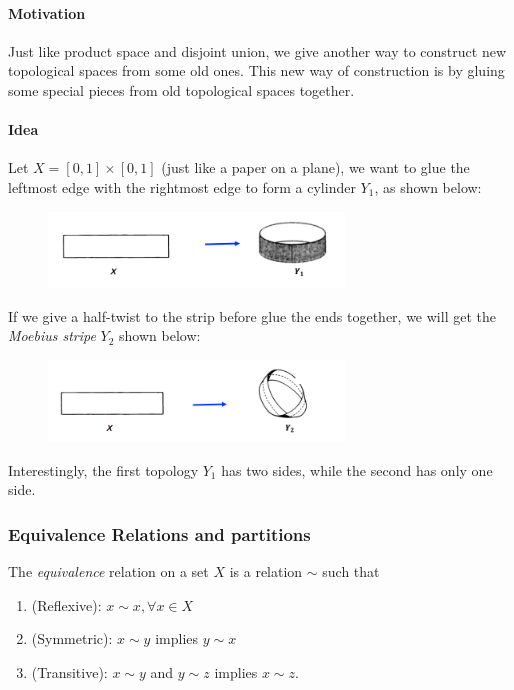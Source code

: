 \paragraph{Motivation}
Just like product space and disjoint union, we give another way to construct new topological spaces from some old ones. This new way of construction is by gluing some special pieces from old topological spaces together.
\paragraph{Idea}
Let $X=[0,1]\times[0,1]$ (just like a paper on a plane), we want to glue the leftmost edge with the rightmost edge to form a cylinder $Y_1$, as shown below:
\begin{figure}[H]
\centering
\includegraphics[width=0.7\textwidth]{week5/p_5}
\end{figure}
If we give a half-twist to the strip before glue the ends together, we will get the \emph{Moebius stripe} $Y_2$ shown below:
\begin{figure}[H]
\centering
\includegraphics[width=0.7\textwidth]{week5/p_6}
\end{figure}
Interestingly, the first topology $Y_1$ has two sides, while the second has only one side.
\subsubsection{Equivalence Relations and partitions}
\begin{definition}
The \emph{equivalence} relation on a set $X$ is a relation $\sim$ such that 
\begin{enumerate}
\item
(Reflexive): $x\sim x,\forall x\in X$
\item
(Symmetric): $x\sim y$ implies $y\sim x$
\item
(Transitive): $x\sim y$ and $y\sim z$ implies $x\sim z$.
\end{enumerate}
\end{definition}

